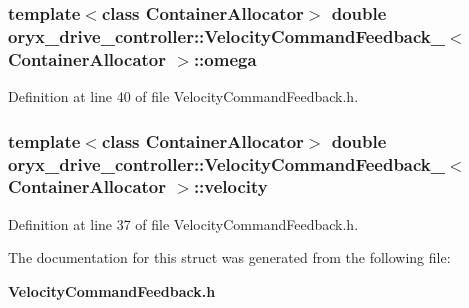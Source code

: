 \subsubsection[{omega}]{\setlength{\rightskip}{0pt plus 5cm}template$<$class \-Container\-Allocator$>$ double {\bf oryx\-\_\-drive\-\_\-controller\-::\-Velocity\-Command\-Feedback\-\_\-}$<$ \-Container\-Allocator $>$\-::{\bf omega}}\label{structoryx__drive__controller_1_1VelocityCommandFeedback___a2619bb779002eeb33a1a30319aba8a52}


\-Definition at line 40 of file \-Velocity\-Command\-Feedback.\-h.

\subsubsection[{velocity}]{\setlength{\rightskip}{0pt plus 5cm}template$<$class \-Container\-Allocator$>$ double {\bf oryx\-\_\-drive\-\_\-controller\-::\-Velocity\-Command\-Feedback\-\_\-}$<$ \-Container\-Allocator $>$\-::{\bf velocity}}\label{structoryx__drive__controller_1_1VelocityCommandFeedback___a0049f70a68833abc04409d172b2adc86}


\-Definition at line 37 of file \-Velocity\-Command\-Feedback.\-h.



\-The documentation for this struct was generated from the following file\-:\begin{DoxyCompactItemize}
\item 
{\bf \-Velocity\-Command\-Feedback.\-h}\end{DoxyCompactItemize}
